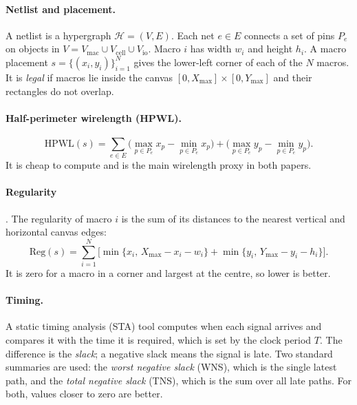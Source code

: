 \documentclass{article}
\begin{document}
\paragraph{Netlist and placement.} A netlist is a hypergraph $\mathcal{H}=(V,E)$. Each net $e\in E$
connects a set of pins $P_e$ on objects in $V=V_{\mathrm{mac}}\cup V_{\mathrm{cell}}\cup V_{\mathrm{io}}$.
Macro $i$ has width $w_i$ and height $h_i$. A macro placement
$s=\{(x_i,y_i)\}_{i=1}^{N}$ gives the lower-left corner of each of the $N$ macros. It is \emph{legal}
if macros lie inside the canvas $[0,X_{\max}]\times[0,Y_{\max}]$ and their rectangles do not overlap.

\paragraph{Half-perimeter wirelength (HPWL).}
\begin{equation}
\mathrm{HPWL}(s)=\sum_{e\in E}\Big(\max_{p\in P_e}x_p-\min_{p\in P_e}x_p\Big)+\Big(\max_{p\in P_e}y_p-\min_{p\in P_e}y_p\Big).
\label{eq:hpwl}
\end{equation}
It is cheap to compute and is the main wirelength proxy in both papers.

\paragraph{Regularity} \citep{xue2024maskregulate}. The regularity of macro $i$ is the sum of its
distances to the nearest vertical and horizontal canvas edges:
\begin{equation}
\mathrm{Reg}(s)=\sum_{i=1}^{N}\Big[\min\{x_i,\,X_{\max}-x_i-w_i\}+\min\{y_i,\,Y_{\max}-y_i-h_i\}\Big].
\label{eq:reg}
\end{equation}
It is zero for a macro in a corner and largest at the centre, so lower is better.

\paragraph{Timing.} A static timing analysis (STA) tool computes when each signal arrives and compares
it with the time it is required, which is set by the clock period $T$. The difference is the
\emph{slack}; a negative slack means the signal is late. Two standard summaries are used: the
\emph{worst negative slack} (WNS), which is the single latest path, and the \emph{total negative
slack} (TNS), which is the sum over all late paths. For both, values closer to zero are better.
\end{document}
